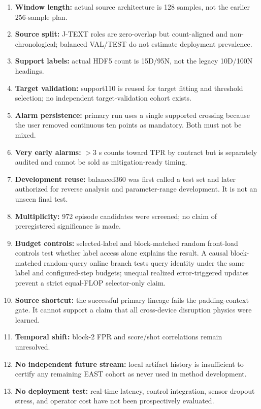 \documentclass[10pt]{article}
\newcommand{\jtext}{J-TEXT}
\newcommand{\east}{EAST}
\begin{document}
\begin{enumerate}
  \item \textbf{Window length:} actual source architecture is 128 samples, not the earlier 256-sample plan.
  \item \textbf{Source split:} \jtext{} roles are zero-overlap but count-aligned and non-chronological; balanced VAL/TEST do not estimate deployment prevalence.
  \item \textbf{Support labels:} actual HDF5 count is 15D/95N, not the legacy 10D/100N headings.
  \item \textbf{Target validation:} support110 is reused for target fitting and threshold selection; no independent target-validation cohort exists.
  \item \textbf{Alarm persistence:} primary run uses a single supported crossing because the user removed continuous ten points as mandatory.  Both must not be mixed.
  \item \textbf{Very early alarms:} $>3$ s counts toward TPR by contract but is separately audited and cannot be sold as mitigation-ready timing.
  \item \textbf{Development reuse:} balanced360 was first called a test set and later authorized for reverse analysis and parameter-range development.  It is not an unseen final test.
  \item \textbf{Multiplicity:} 972 episode candidates were screened; no claim of preregistered significance is made.
  \item \textbf{Budget controls:} selected-label and block-matched random front-load controls test whether label access alone explains the result.  A causal block-matched random-query online branch tests query identity under the same label and configured-step budgets; unequal realized error-triggered updates prevent a strict equal-FLOP selector-only claim.
  \item \textbf{Source shortcut:} the successful primary lineage fails the padding-context gate.  It cannot support a claim that all cross-device disruption physics were learned.
  \item \textbf{Temporal shift:} block-2 FPR and score/shot correlations remain unresolved.
  \item \textbf{No independent future stream:} local artifact history is insufficient to certify any remaining \east{} cohort as never used in method development.
  \item \textbf{No deployment test:} real-time latency, control integration, sensor dropout stress, and operator cost have not been prospectively evaluated.
\end{enumerate}
\end{document}

